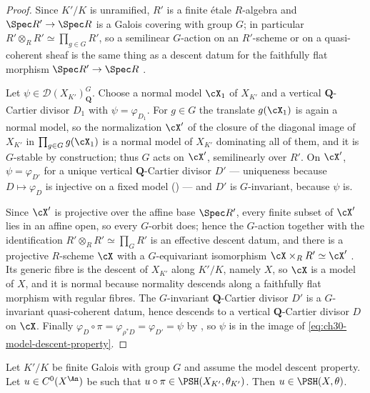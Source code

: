 \begin{proof}
Since \(K'/K\) is unramified, \(R'\) is a finite étale \(R\)-algebra and
\(\Spec R'\to\Spec R\) is a Galois covering with group \(G\); in
particular \(R'\otimes_RR'\simeq\prod_{g\in G}R'\), so a semilinear
\(G\)-action on an \(R'\)-scheme or on a quasi-coherent sheaf is the same
thing as a descent datum for the faithfully flat morphism
\(\Spec R'\to\Spec R\) \cite[Exp.~VIII]{SGA1}.

Let \(\psi\in\mathcal D(X_{K'})_{\mathbf Q}^G\).  Choose a normal model
\(\cX_1\) of \(X_{K'}\) and a vertical \(\mathbf Q\)-Cartier divisor
\(D_1\) with \(\psi=\varphi_{D_1}\).  For \(g\in G\) the translate
\(g(\cX_1)\) is again a normal model, so the normalization \(\cX'\) of the
closure of the diagonal image of \(X_{K'}\) in
\(\prod_{g\in G}g(\cX_1)\) is a normal model of \(X_{K'}\) dominating all
of them, and it is \(G\)-stable by construction; thus \(G\) acts on
\(\cX'\), semilinearly over \(R'\).  On \(\cX'\), \(\psi=\varphi_{D'}\) for
a unique vertical \(\mathbf Q\)-Cartier divisor \(D'\) --- uniqueness
because \(D\mapsto\varphi_D\) is injective on a fixed model
() --- and \(D'\) is \(G\)-invariant,
because \(\psi\) is.

Since \(\cX'\) is projective over the affine base \(\Spec R'\), every finite
subset of \(\cX'\) lies in an affine open, so every \(G\)-orbit does; hence
the \(G\)-action together with the identification
\(R'\otimes_RR'\simeq\prod_GR'\) is an effective descent datum, and there is
a projective \(R\)-scheme \(\cX\) with a \(G\)-equivariant isomorphism
\(\cX\times_RR'\simeq\cX'\) \cite[Exp.~VIII]{SGA1}.  Its generic fibre is
the descent of \(X_{K'}\) along \(K'/K\), namely \(X\), so \(\cX\) is a
model of \(X\), and it is normal because normality descends along a
faithfully flat morphism with regular fibres.  The \(G\)-invariant
\(\mathbf Q\)-Cartier divisor \(D'\) is a \(G\)-invariant quasi-coherent
datum, hence descends to a vertical \(\mathbf Q\)-Cartier divisor \(D\) on
\(\cX\).  Finally \(\varphi_D\circ\pi=\varphi_{\rho^*D}=\varphi_{D'}=\psi\)
by , so \(\psi\) is in the image
of \eqref{eq:ch30-model-descent-property}.
\end{proof}

\begin{theorem}
\label{thm:ch30-continuous-descent}
Let \(K'/K\) be finite Galois with group \(G\) and assume the model descent
property.  Let \(u\in C^0(X^{\An})\) be such that
\(u\circ\pi\in\PSH(X_{K'},\theta_{K'})\).  Then \(u\in\PSH(X,\theta)\).
\end{theorem}

